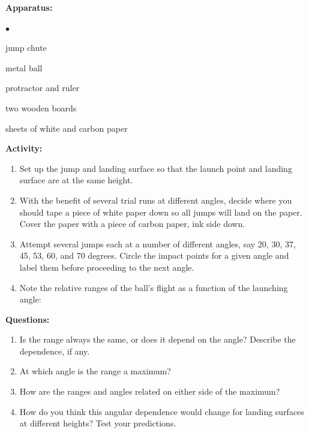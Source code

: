 {\noindent \bf Apparatus:} \begin{list}{$\bullet$}{\itemsep0pt }

\item jump chute \item metal ball \item protractor and ruler \item two wooden boards \item sheets of white and carbon paper

\end{list}

{\noindent \bf Activity:} \begin{enumerate}

\item  Set up the jump and landing surface so that the launch point and landing surface are at the same height.

\item  With the benefit of several trial runs at different angles, decide where you should tape a piece of white paper down so all jumps will land on the paper. Cover the paper with a piece of carbon paper, ink side down.

\item  Attempt several jumps each at a number of different angles, say 20, 30, 37, 45, 53, 60, and 70 degrees. Circle the impact points for a given angle and label them before proceeding to the next angle.

\item  Note the relative ranges of the ball's flight as a function of the launching angle: \vskip35pt

\end{enumerate}

\pagebreak

\textbf{Questions:}

\begin{enumerate}
\item Is the range always the same, or does it depend on the angle? Describe the dependence,
if any. \vspace{20mm}

\item At which angle is the range a maximum?\vspace{10mm}

\item How are the ranges and angles related on either side of the maximum?\vspace{20mm}

\item How do you think this angular dependence would change for landing surfaces at
different heights? Test your predictions.
\end{enumerate}
